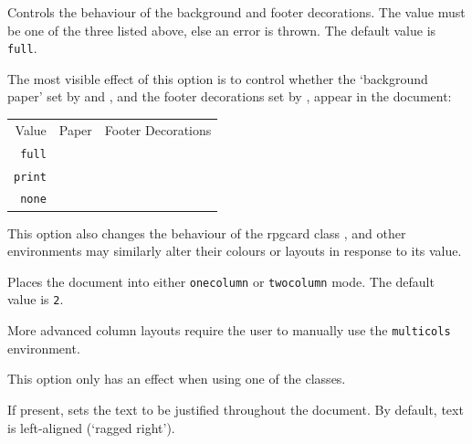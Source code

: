 		{
			Controls the behaviour of the background and footer decorations. The value must be one of the three listed above, else an error is thrown. The default value is \texttt{full}.

			The most visible effect of this option is to control whether the `background paper' set by  and , and the footer decorations set by , appear in the document:

			\begin{center}
				\begin{tabular}{rcc}
					Value          & Paper  & Footer Decorations
					\\
					\texttt{full}  & \cmark & \cmark
					\\
					\texttt{print} & \xmark & \cmark
					\\
					\texttt{none}  & \xmark & \xmark
				\end{tabular}
			\end{center}

			This option also changes the behaviour of the rpgcard class , and other environments may similarly alter their colours or layouts in response to its value.
		}
		{
			Places the document into either \texttt{onecolumn} or \texttt{twocolumn} mode. The default value is \texttt{2}.

			More advanced column layouts require the user to manually use the \texttt{multicols} environment.

			This option only has an effect when using one of the \rpgtex{} classes.
		}
		{
			If present, sets the text to be justified throughout the document. By default, text is left-aligned (`ragged right').
		}

